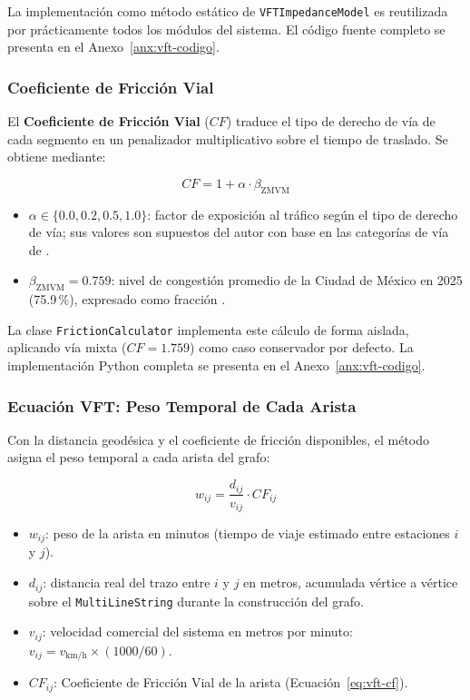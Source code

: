 La implementación como método estático de \texttt{VFTImpedanceModel} es
reutilizada por prácticamente todos los módulos del sistema. El código fuente
completo se presenta en el Anexo~\ref{anx:vft-codigo}.

\subsubsection{Coeficiente de Fricción Vial}
\label{subsec:vft-cf}

El \textbf{Coeficiente de Fricción Vial} ($CF$) traduce el tipo de derecho de
vía de cada segmento en un penalizador multiplicativo sobre el tiempo de
traslado. Se obtiene mediante:

\begin{equation}
    CF = 1 + \alpha \cdot \beta_{\text{ZMVM}}
    \label{eq:vft-cf}
\end{equation}

\begin{itemize}
    \item $\alpha \in \{0.0, 0.2, 0.5, 1.0\}$: factor de exposición al tráfico
    según el tipo de derecho de vía; sus valores son supuestos del autor con
    base en las categorías de vía de \citet{sedatu2019manual}.
    \item $\beta_{\text{ZMVM}} = 0.759$: nivel de congestión promedio de la
    Ciudad de México en 2025 (75.9\,\%), expresado como fracción
    \citep{tomtom_traffic_index_2025}.
\end{itemize}

La clase \texttt{FrictionCalculator} implementa este cálculo de forma aislada,
aplicando vía mixta ($CF = 1.759$) como caso conservador por defecto. La
implementación Python completa se presenta en el Anexo~\ref{anx:vft-codigo}.

\subsubsection{Ecuación VFT: Peso Temporal de Cada Arista}
\label{subsec:vft-ecuacion}

Con la distancia geodésica y el coeficiente de fricción disponibles, el método
 asigna el peso temporal a cada arista del grafo:

\begin{equation}
    w_{ij} = \frac{d_{ij}}{v_{ij}} \cdot CF_{ij}
    \label{eq:vft-peso}
\end{equation}

\begin{itemize}
    \item $w_{ij}$: peso de la arista en minutos (tiempo de viaje estimado entre
    estaciones $i$ y $j$).
    \item $d_{ij}$: distancia real del trazo entre $i$ y $j$ en metros,
    acumulada vértice a vértice sobre el \texttt{MultiLineString} durante la
    construcción del grafo.
    \item $v_{ij}$: velocidad comercial del sistema en metros por minuto:
    $v_{ij} = v_{\text{km/h}} \times (1000/60)$.
    \item $CF_{ij}$: Coeficiente de Fricción Vial de la arista
    (Ecuación~\ref{eq:vft-cf}).
\end{itemize}

